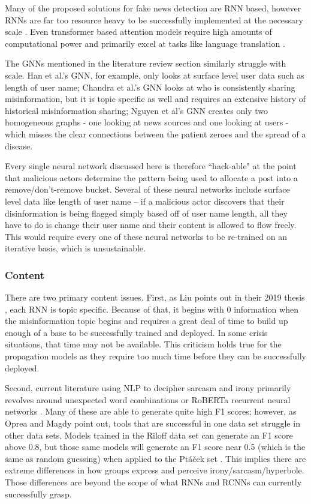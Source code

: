 \documentclass[preprint,12pt]{elsarticle}
\begin{document}
Many of the proposed solutions for fake news detection are RNN based, however RNNs are far too resource heavy to be successfully implemented at the necessary scale \cite{gehring2017novel, sze2017efficient}. Even transformer based attention models require high amounts of computational power and primarily excel at tasks like language translation \cite{vaswani2017attention}. 

The GNNs mentioned in the literature review section similarly struggle with scale. Han et al.'s GNN, for example, only looks at surface level user data such as length of user name; Chandra et al.'s GNN looks at who is consistently sharing misinformation, but it is topic specific as well and requires an extensive history of historical misinformation sharing; Nguyen et al's GNN creates only two homogeneous graphs - one looking at news sources and one looking at users - which misses the clear connections between the patient zeroes and the spread of a disease.

Every single neural network discussed here is therefore ``hack-able" at the point that malicious actors determine the pattern being used to allocate a post into a remove/don't-remove bucket. Several of these neural networks include surface level data like length of user name -- if a malicious actor discovers that their disinformation is being flagged simply based off of user name length, all they have to do is change their user name and their content is allowed to flow freely. This would require every one of these neural networks to be re-trained on an iterative basis, which is unsustainable.

\subsubsection{Content}
There are two primary content issues. First, as Liu points out in their 2019 thesis \cite{liu2019early}, each RNN is topic specific. Because of that, it begins with 0 information when the misinformation topic begins and requires a great deal of time to build up enough of a base to be successfully trained and deployed. In some crisis situations, that time may not be available. This criticism holds true for the propagation models as they require too much time before they can be successfully deployed.

Second, current literature using NLP to decipher sarcasm and irony primarily revolves around unexpected word combinations \cite{barbieri2014modelling,buschmeier2014impact,ghosh2015sarcastic} or RoBERTa recurrent neural networks \cite{potamias2020transformer}. Many of these are able to generate quite high F1 scores; however, as Oprea and Magdy point out, tools that are successful in one data set struggle in other data sets. Models trained in the Riloff data set can generate an F1 score above 0.8, but those same models will generate an F1 score near 0.5 (which is the same as random guessing) when applied to the Pt{\'a}{\v{c}}ek set \cite{oprea2019exploring}. This implies there are extreme differences in how groups express and perceive irony/sarcasm/hyperbole. Those differences are beyond the scope of what RNNs and RCNNs can currently successfully grasp.
\end{document}
